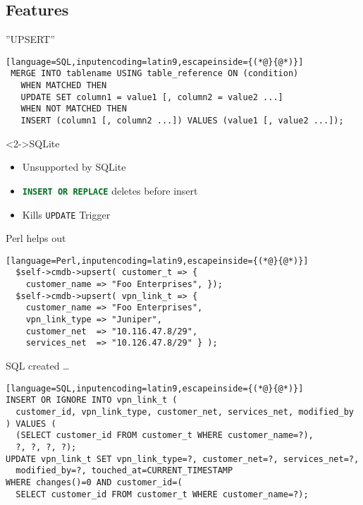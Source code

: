 \documentclass[ngerman,xcolor={table,dvipsnames},smaller,compress,hyperref={bookmarks,colorlinks}]{beamer}%
\begin{document}
\subsection{Features}

\begin{frame}[fragile]{}
\begin{block}{''UPSERT''}
\scriptsize
\begin{lstlisting}[language=SQL,inputencoding=latin9,escapeinside={(*@}{@*)}]
 MERGE INTO tablename USING table_reference ON (condition)
   WHEN MATCHED THEN
   UPDATE SET column1 = value1 [, column2 = value2 ...]
   WHEN NOT MATCHED THEN
   INSERT (column1 [, column2 ...]) VALUES (value1 [, value2 ...]);
\end{lstlisting}
\end{block}

\begin{block}<2->{SQLite}
\begin{itemize}
\item<2-> Unsupported by SQLite
\item<3-> \lstinline[language=SQL,inputencoding=latin9]!INSERT OR REPLACE! deletes before insert
\item[$\rightarrow$]<4-> Kills \texttt{UPDATE} Trigger
\end{itemize}
\end{block}
\end{frame}

\begin{frame}[fragile]{}
\begin{block}{Perl helps out}
\scriptsize
\begin{lstlisting}[language=Perl,inputencoding=latin9,escapeinside={(*@}{@*)}]
  $self->cmdb->upsert( customer_t => {
    customer_name => "Foo Enterprises", });
  $self->cmdb->upsert( vpn_link_t => {
    customer_name => "Foo Enterprises",
    vpn_link_type => "Juniper",
    customer_net  => "10.116.47.8/29",
    services_net  => "10.126.47.8/29" } );
\end{lstlisting}
\end{block}

\begin{block}{SQL created \ldots}
\scriptsize
\begin{lstlisting}[language=SQL,inputencoding=latin9,escapeinside={(*@}{@*)}]
INSERT OR IGNORE INTO vpn_link_t (
  customer_id, vpn_link_type, customer_net, services_net, modified_by
) VALUES (
  (SELECT customer_id FROM customer_t WHERE customer_name=?),
  ?, ?, ?, ?);
UPDATE vpn_link_t SET vpn_link_type=?, customer_net=?, services_net=?,
  modified_by=?, touched_at=CURRENT_TIMESTAMP
WHERE changes()=0 AND customer_id=(
  SELECT customer_id FROM customer_t WHERE customer_name=?);
\end{lstlisting}
\end{block}
\end{frame}
\end{document}
